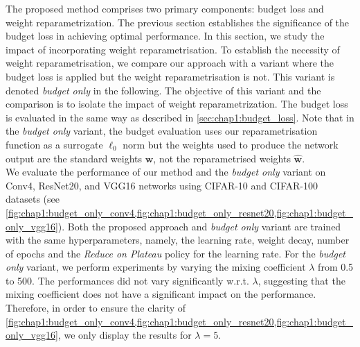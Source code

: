 
The proposed method comprises two primary components: budget loss and weight
reparametrization. The previous section establishes the significance of the
budget loss in achieving optimal performance. In this section, we study the
impact of incorporating weight reparametrisation. To establish the necessity of
weight reparametrisation, we compare our approach with a variant where the
budget loss is applied but the weight reparametrisation is not. This variant is
denoted \emph{budget only} in the following. The objective of this variant and
the comparison is to isolate the impact of weight reparametrization. The budget
loss is evaluated in the same way as described in \cref{sec:chap1:budget_loss}.
Note that in the \emph{budget only} variant, the budget evaluation uses our
reparametrisation function as a surrogate $\ell_0$ norm but the weights used to
produce the network output are the standard weights $\mathbf{w}$, not the
reparametrised weights $\mathbf{\hat{w}}$.\\

We evaluate the performance of our method and the \emph{budget only} variant on
Conv4, ResNet20, and VGG16 networks using CIFAR-10 and CIFAR-100 datasets (see
\cref{fig:chap1:budget_only_conv4,fig:chap1:budget_only_resnet20,fig:chap1:budget_only_vgg16}).
Both the proposed approach and \emph{budget only} variant are trained with the
same hyperparameters, namely, the learning rate, weight decay, number of epochs
and the \emph{Reduce on Plateau} policy for the learning rate. For the
\textit{budget only} variant,  we perform experiments by varying the mixing
coefficient $\lambda$ from 0.5 to 500. The performances did not vary
significantly w.r.t. $\lambda$, suggesting that the mixing coefficient does not
have a significant impact on the performance. Therefore, in order to ensure the
clarity of
\cref{fig:chap1:budget_only_conv4,fig:chap1:budget_only_resnet20,fig:chap1:budget_only_vgg16},
we only display the results for $\lambda = 5$.\\

